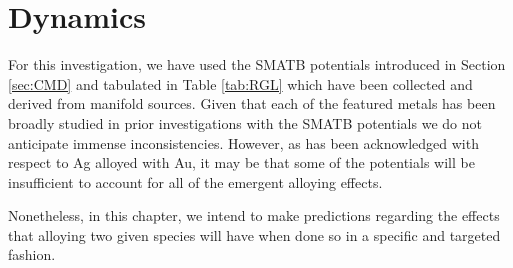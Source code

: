 \section{Dynamics}
\label{sec:alloy_dyn}

For this investigation, we have used the SMATB potentials introduced in Section \ref{sec:CMD} and tabulated in Table \ref{tab:RGL} which have been collected and derived from manifold sources. Given that each of the featured metals has been broadly studied in prior investigations with the SMATB potentials \cite{RGL,RGL_Alloy_PdPt,RGL_CuPt,Mirko,AuAg} we do not anticipate immense inconsistencies. However, as has been acknowledged with respect to Ag alloyed with Au, it may be that some of the potentials will be insufficient to account for all of the emergent alloying effects. 

Nonetheless, in this chapter, we intend to make predictions regarding the effects that alloying two given species will have when done so in a specific and targeted fashion.


